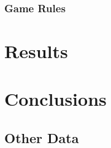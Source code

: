 \documentclass[a4paper]{report}
\begin{document}
		\subsection{Game Rules}



\chapter{Results}


\chapter{Conclusions}




\begin{appendices}
\chapter{Other Data}
	
\end{appendices}
\end{document}
